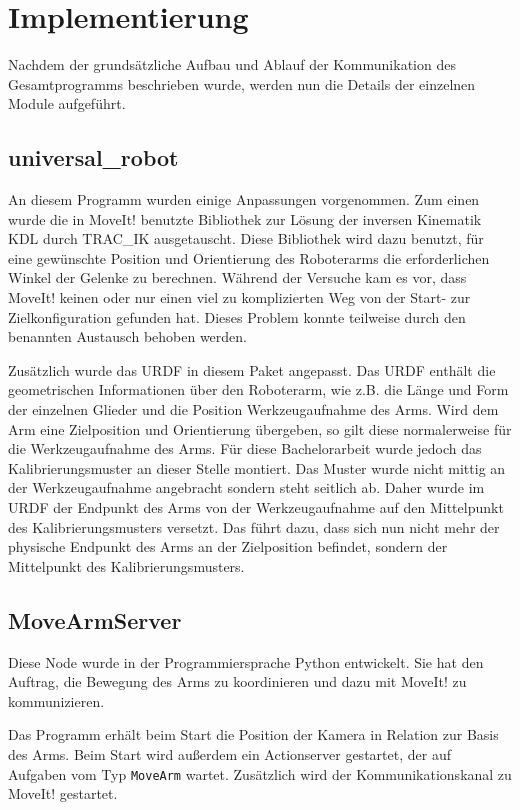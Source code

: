 \chapter{Implementierung}
\label{chap:implementierung}
Nachdem der grundsätzliche Aufbau und Ablauf der Kommunikation des Gesamtprogramms beschrieben wurde, werden nun die Details der einzelnen Module aufgeführt.

\section{universal\_robot} %
\label{sec:universal_robot_impl}
An diesem Programm wurden einige Anpassungen vorgenommen. Zum einen wurde die in MoveIt! benutzte Bibliothek zur Lösung der inversen Kinematik KDL durch TRAC\_IK ausgetauscht. Diese Bibliothek wird dazu benutzt, für eine gewünschte Position und Orientierung des Roboterarms die erforderlichen Winkel der Gelenke zu berechnen. Während der Versuche kam es vor, dass MoveIt! keinen oder nur einen viel zu komplizierten Weg von der Start- zur Zielkonfiguration gefunden hat. Dieses Problem konnte teilweise durch den benannten Austausch behoben werden.

Zusätzlich wurde das URDF in diesem Paket angepasst. Das URDF enthält die geometrischen Informationen über den Roboterarm, wie z.B. die Länge und Form der einzelnen Glieder und die Position Werkzeugaufnahme des Arms. Wird dem Arm eine Zielposition und Orientierung übergeben, so gilt diese normalerweise für die Werkzeugaufnahme des Arms. Für diese Bachelorarbeit wurde jedoch das Kalibrierungsmuster an dieser Stelle montiert. Das Muster wurde nicht mittig an der Werkzeugaufnahme angebracht sondern steht seitlich ab. Daher wurde im URDF der Endpunkt des Arms von der Werkzeugaufnahme auf den Mittelpunkt des Kalibrierungsmusters versetzt. Das führt dazu, dass sich nun nicht mehr der physische Endpunkt des Arms an der Zielposition befindet, sondern der Mittelpunkt des Kalibrierungsmusters.

\section{MoveArmServer} %
\label{sec:movearmserver_impl}
Diese Node wurde in der Programmiersprache Python entwickelt. Sie hat den Auftrag, die Bewegung des Arms zu koordinieren und dazu mit MoveIt! zu kommunizieren.

Das Programm erhält beim Start die Position der Kamera in Relation zur Basis des Arms. Beim Start wird außerdem ein Actionserver gestartet, der auf Aufgaben vom Typ \texttt{MoveArm} wartet. Zusätzlich wird der Kommunikationskanal zu MoveIt! gestartet.

